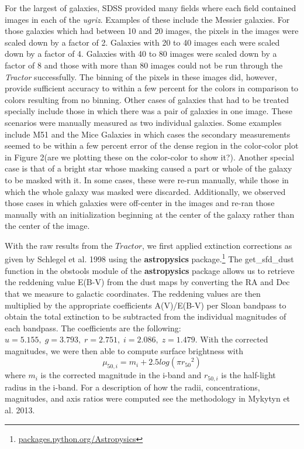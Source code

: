 \documentclass[12pt,preprint,pdftex]{aastex}
\begin{document}
For the largest of galaxies, SDSS provided many fields where each field contained images in each of the \textit{ugriz}. Examples of these include the Messier galaxies. For those galaxies which had between 10 and 20 images, the pixels in the images were scaled down by a factor of 2. Galaxies with 20 to 40 images each were scaled down by a factor of 4. Galaxies with 40 to 80 images were scaled down by a factor of 8 and those with more than 80 images could not be run through the \textit{Tractor} successfully. The binning of the pixels in these images did, however, provide sufficient accuracy to within a few percent for the colors in comparison to colors resulting from no binning. Other cases of galaxies that had to be treated specially include those in which there was a pair of galaxies in one image. These scenarios were manually measured as two individual galaxies. Some examples include M51 and the Mice Galaxies in which cases the secondary measurements seemed to be within a few percent error of the dense region in the color-color plot in Figure 2(are we plotting these on the color-color to show it?). Another special case is that of a bright star whose masking caused a part or whole of the galaxy to be masked with it. In some cases, these were re-run manually, while those in which the whole galaxy was masked were discarded.  Additionally, we observed those cases in which galaxies were off-center in the images and re-ran those manually with an initialization beginning at the center of the galaxy rather than the center of the image. 

With the raw results from the $Tractor$, we first applied extinction corrections as given by Schlegel et al. 1998 using the \textbf{astropysics} package.\footnote{\url{packages.python.org/Astropysics}} The get\_sfd\_dust function in the obstools module of the {\bf astropysics} package allows us to retrieve the reddening value E(B-V) from the dust maps by converting the RA and Dec that we measure to galactic coordinates. The reddening values are then multiplied by the appropriate coefficients A(V)/E(B-V) per Sloan bandpass to obtain the total extinction to be subtracted from the individual magnitudes of each bandpass. The coefficients are the following: $u=5.155,\;g=3.793,\; r=2.751,\; i=2.086,\; z=1.479$. With the corrected magnitudes, we were then able to compute surface brightness with \begin{equation} \mu_{50,i}=m_i+2.5log(\pi{r_{50}}^2) \end{equation} where $m_i$ is the corrected magnitude in the i-band and $r_{50,i}$ is the half-light radius in the i-band. For a description of how the radii, concentrations, magnitudes, and axis ratios were computed see the methodology in Mykytyn et al. 2013. 
\end{document}

